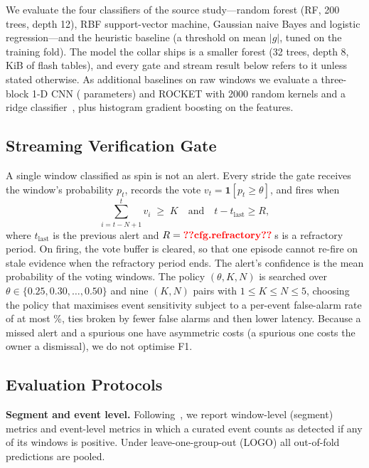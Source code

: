 We evaluate the four classifiers of the source study---random forest (RF, 200 trees, depth 12), RBF support-vector machine, Gaussian naive Bayes and logistic regression---and the heuristic baseline (a threshold on mean $|g|$, tuned on the training fold). The model the collar ships is a smaller forest (32 trees, depth 8, \,KiB of flash tables), and every gate and stream result below refers to it unless stated otherwise. As additional baselines on raw windows we evaluate a three-block 1-D CNN ( parameters) and ROCKET with 2000 random kernels and a ridge classifier~\cite{dempster2020rocket}, plus histogram gradient boosting on the features.

\subsection{Streaming Verification Gate}
\label{sec:gate}
A single window classified as spin is not an alert. Every stride the gate receives the window's probability $p_t$, records the vote $v_t = \mathbf{1}[p_t \geq \theta]$, and fires when
\begin{equation}
\sum_{i=t-N+1}^{t} v_i \;\geq\; K \quad\text{and}\quad t - t_{\text{last}} \geq R,
\label{eq:gate}
\end{equation}
where $t_{\text{last}}$ is the previous alert and $R=\R{cfg.refractory}$\,s is a refractory period. On firing, the vote buffer is cleared, so that one episode cannot re-fire on stale evidence when the refractory period ends. The alert's confidence is the mean probability of the voting windows. The policy $(\theta,K,N)$ is searched over $\theta \in \{0.25,0.30,\dots,0.50\}$ and nine $(K,N)$ pairs with $1\leq K\leq N\leq 5$, choosing the policy that maximises event sensitivity subject to a per-event false-alarm rate of at most \%, ties broken by fewer false alarms and then lower latency. Because a missed alert and a spurious one have asymmetric costs (a spurious one costs the owner a dismissal), we do not optimise F1.

\subsection{Evaluation Protocols}
\label{sec:protocols}

\textbf{Segment and event level.} Following~\cite{brady2025collar}, we report window-level (segment) metrics and event-level metrics in which a curated event counts as detected if any of its windows is positive. Under leave-one-group-out (LOGO) all out-of-fold predictions are pooled.

